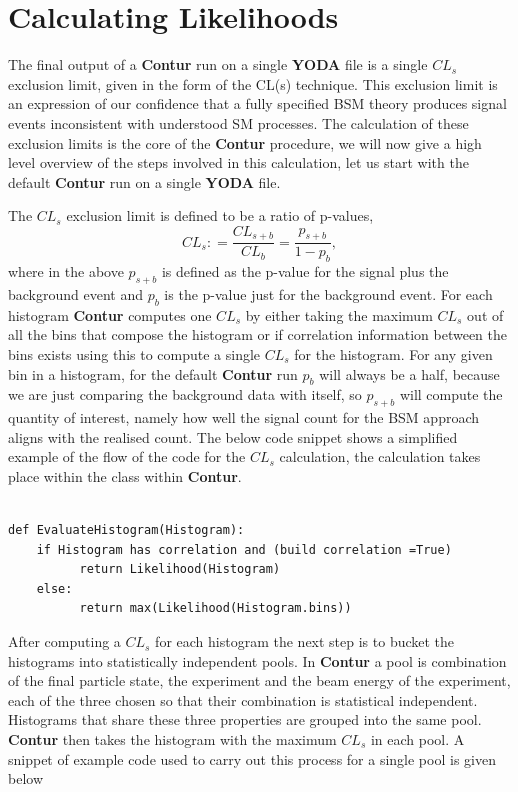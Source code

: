 \section{Calculating Likelihoods}\label{calculate_likelihood}

The final output of a \textbf{Contur} run on a single \textbf{YODA} file is a single $CL_s$ exclusion limit, given in the form of the CL(s) technique\cite{cls}. This exclusion limit is an expression of our confidence that a fully specified BSM theory produces signal events inconsistent with understood SM processes.  The calculation of these exclusion limits is the core of the \textbf{Contur} procedure, we will now give a high level overview of the steps involved in this calculation, let us start with the default \textbf{Contur} run on a single \textbf{YODA} file.

The $CL_s$ exclusion limit is defined to be a ratio of p-values,
$$ CL_s: = \frac{CL_{s+b}}{CL_{b}} = \frac{p_{s+b}}{1- p_{b}}, $$
where in the above $p_{s+b}$ is defined as the p-value for the signal plus the background event and $p_{b}$ is the p-value just for the background event. For each histogram \textbf{Contur} computes one $CL_{s}$ by either taking the maximum $CL_{s}$ out of all the bins that compose the histogram or if correlation information between the bins exists using this to compute a single $CL_s$ for the histogram. For any given bin in a histogram, for the default \textbf{Contur} run $p_b$ will always be a half, because we are just comparing the background data with itself, so $p_{s+b}$ will compute the quantity of interest, namely how well the signal count for the BSM approach aligns with the realised count. The below code snippet shows a simplified example of the  flow of the code for the $CL_s$ calculation, the calculation takes place within the  class within \textbf{Contur}.

\begin{code}
\label{code:histo}
\begin{verbatim}

def EvaluateHistogram(Histogram):
    if Histogram has correlation and (build correlation =True)
          return Likelihood(Histogram)
    else:
          return max(Likelihood(Histogram.bins))
\end{verbatim}
\end{code}

After computing a $CL_{s}$ for each histogram the next step is to bucket the histograms into statistically independent pools. In \textbf{Contur} a pool is combination of the final particle state, the experiment and the beam energy of the experiment, each of the three chosen so that their combination is statistical independent. Histograms that share these three properties are grouped into the same pool. \textbf{Contur} then takes the histogram with the maximum $CL_s$ in each pool. A snippet of example code used to carry out this process for a single pool is given below

